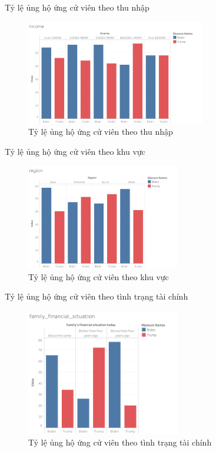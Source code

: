 \documentclass[10pt]{beamer}
\theoremstyle{remark}
\theoremstyle{definition}
\begin{document}
\begin{frame}{Tỷ lệ ủng hộ ứng cử viên theo thu nhập}
	\begin{figure}[h!]
        \centering
        \includegraphics[width=0.7\textwidth]{figures/income.png}
        \caption{Tỷ lệ ủng hộ ứng cử viên theo thu nhập}
    \end{figure}
\end{frame}


\begin{frame}{Tỷ lệ ủng hộ ứng cử viên theo khu vực}
	\begin{figure}[h!]
        \centering
        \includegraphics[width=0.6\textwidth]{figures/region.png}
        \caption{Tỷ lệ ủng hộ ứng cử viên theo khu vực}
    \end{figure}
\end{frame}

\begin{frame}{Tỷ lệ ủng hộ ứng cử viên theo tình trạng tài chính}
	\begin{figure}[h!]
        \centering
        \includegraphics[width=0.6\textwidth]{figures/family_financial_situation.png}
        \caption{Tỷ lệ ủng hộ ứng cử viên theo tình trạng tài chính}
    \end{figure}
\end{frame}
\end{document}
